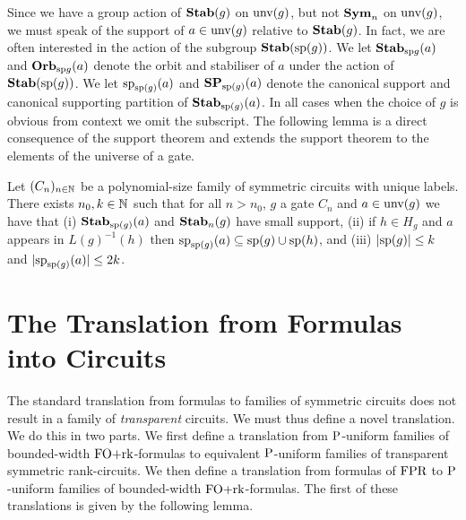 \documentclass[a4paper,UKenglish]{lipics-v2018}
\begin{document}
Since we have a group action of $\text{\textbf{Stab}}(g)$ on $\text{unv}(g)$, but not $\text{\textbf{Sym}}_n$
on $\text{unv}(g)$, we must speak of the support of $a \in \text{unv}(g)$ relative
to $\text{\textbf{Stab}}(g)$. In fact, we are often interested in the action of the subgroup
$\text{\textbf{Stab}} (\text{sp} (g))$. We let $\text{\textbf{Stab}}_{\text{sp}{g}}(a)$ and $\text{\textbf{Orb}}_{\text{sp}{g}}(a)$ denote the
orbit and stabiliser of $a$ under the action of $\text{\textbf{Stab}} (\text{sp} (g))$. We let
$\text{sp}_{\text{sp}(g)}(a)$ and $\text{\textbf{SP}}_{\text{sp}(g)}(a)$ denote the canonical support
and canonical supporting partition of $\text{\textbf{Stab}}_{\text{sp}(g)}(a)$. In all cases when
the choice of $g$ is obvious from context we omit the subscript. The following
lemma is a direct consequence of the support theorem and extends the support
theorem to the elements of the universe of a gate.

\begin{lemma}
  \label{lem:row-column-supports}
  Let $(C_n)_{n \in \mathbb{N}}$ be a polynomial-size family of symmetric circuits
  with unique labels. There exists $n_0, k \in \mathbb{N}$ such that for all $n >
  n_0$, $g$ a gate $C_n$ and $a \in \text{unv}(g)$ we have that (i)
  $\text{\textbf{Stab}}_{\text{sp}(g)}(a)$ and $\text{\textbf{Stab}}_{n}(g)$ have small support, (ii) if $h \in
  H_g$ and $a$ appears in $L(g)^{-1}(h)$ then $\text{sp}_{\text{sp}(g)}(a) \subseteq
  \text{sp}(g) \cup \text{sp}(h)$, and (iii) $\vert \text{sp}(g) \vert \leq k$ and $\vert
  \text{sp}_{\text{sp}(g)}(a) \vert \leq 2k$.
\end{lemma}

\section{The Translation from Formulas into
  Circuits}\label{sec:formulas-to-circuits}
The standard translation from formulas to families of symmetric circuits does
not result in a family of \emph{transparent} circuits. We must thus define a
novel translation. We do this in two parts. We first define a translation from
$\mathrm{P}$-uniform families of bounded-width $\text{\upshape FO+rk}$-formulas to equivalent
$\mathrm{P}$-uniform families of transparent symmetric rank-circuits. We then define a
translation from formulas of $\text{\upshape FPR}$ to $\mathrm{P}$-uniform families of bounded-width
$\text{\upshape FO+rk}$-formulas. The first of these translations is given by the following
lemma.
\end{document}
